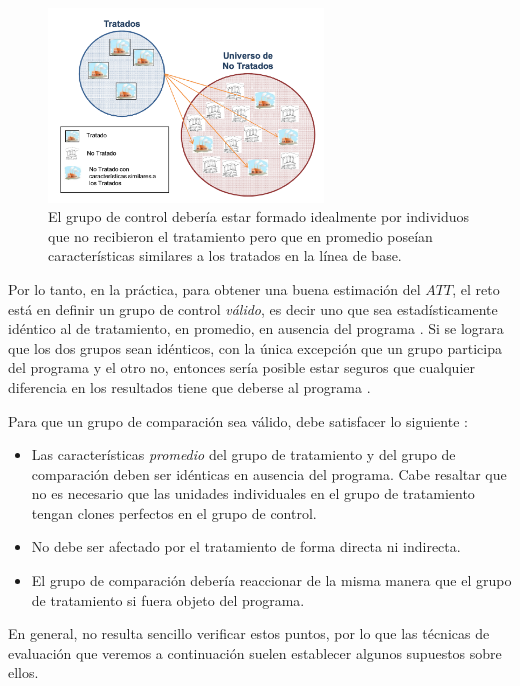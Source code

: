 \documentclass[../../main.tex]{subfiles}
\begin{document}
\begin{figure}[ht]
    \centering
    \includegraphics[width=0.65\textwidth]{figs/grupo-de-control.png}
    \caption{El grupo de control debería estar formado idealmente por individuos que no
    recibieron el tratamiento pero que en promedio poseían características similares a
    los tratados en la línea de base.}
    \label{fig:control-group}
\end{figure}

Por lo tanto, en la práctica, para obtener una buena estimación del \(ATT\), el reto está
en definir un grupo de control \textit{válido}, es decir uno que sea estadísticamente
idéntico al de tratamiento, en promedio, en ausencia del programa \cite{gertler-2016}. Si
se lograra que los dos grupos sean idénticos, con la única excepción que un grupo
participa del programa y el otro no, entonces sería posible estar seguros que cualquier
diferencia en los resultados tiene que deberse al programa \cite{gertler-2016}.

Para que un grupo de comparación sea válido, debe satisfacer lo siguiente \cite{gertler-2016}:
\begin{itemize}
    \item Las características \textit{promedio} del grupo de tratamiento y del grupo de
    comparación deben ser idénticas en ausencia del programa. Cabe resaltar que no es
    necesario que las unidades individuales en el grupo de tratamiento tengan clones
    perfectos en el grupo de control.
    \item No debe ser afectado por el tratamiento de forma directa ni indirecta.
    \item El grupo de comparación debería reaccionar de la misma manera que el grupo de
    tratamiento si fuera objeto del programa.
\end{itemize}
En general, no resulta sencillo verificar estos puntos, por lo que las técnicas de
evaluación que veremos a continuación suelen establecer algunos supuestos sobre ellos.
\end{document}
